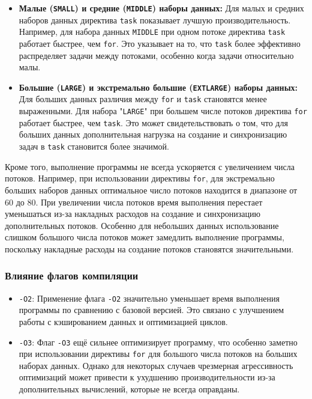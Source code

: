 \documentclass[a4paper, 11pt]{article}
\begin{document}
\begin{itemize}
    \item \textbf{Малые (\texttt{SMALL}) и средние (\texttt{MIDDLE}) наборы данных:} Для малых и средних наборов данных директива \texttt{task} показывает лучшую производительность. Например, для набора данных \texttt{MIDDLE} при одном потоке директива \texttt{task} работает быстрее, чем \texttt{for}. Это указывает на то, что \texttt{task} более эффективно распределяет задачи между потоками, особенно когда задачи относительно малы.
    \item \textbf{Большие (\texttt{LARGE}) и экстремально большие (\texttt{EXTLARGE}) наборы данных:} Для больших данных различия между \texttt{for} и \texttt{task} становятся менее выраженными. Для набора "\texttt{LARGE}" при большем числе потоков директива \texttt{for} работает быстрее, чем \texttt{task}. Это может свидетельствовать о том, что для больших данных дополнительная нагрузка на создание и синхронизацию задач в \texttt{task} становится более значимой.
\end{itemize}

Кроме того, выполнение программы не всегда ускоряется с увеличением числа потоков. Например, при использовании директивы \texttt{for}, для экстремально больших наборов данных оптимальное число потоков находится в диапазоне от 60 до 80. При увеличении числа потоков время выполнения перестает уменьшаться из-за накладных расходов на создание и синхронизацию дополнительных потоков. Особенно для небольших данных использование слишком большого числа потоков может замедлить выполнение программы, поскольку накладные расходы на создание потоков становятся значительными.


\subsubsection*{Влияние флагов компиляции}

\begin{itemize}
    \item \texttt{-O2}: Применение флага \texttt{-O2} значительно уменьшает время выполнения программы по сравнению с базовой версией. Это связано с улучшением работы с кэшированием данных и оптимизацией циклов.
    \item \texttt{-O3}: Флаг \texttt{-O3} ещё сильнее оптимизирует программу, что особенно заметно при использовании директивы \texttt{for} для большого числа потоков на больших наборах данных. Однако для некоторых случаев чрезмерная агрессивность оптимизаций может привести к ухудшению производительности из-за дополнительных вычислений, которые не всегда оправданы.
\end{itemize}
\newpage
\end{document}
